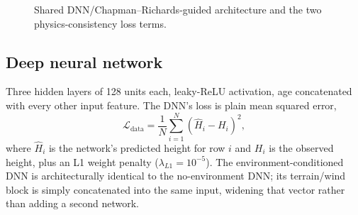 \documentclass[11pt,a4paper]{report}
\begin{document}
\begin{figure}[!htbp]
\centering
{}
\caption{Shared DNN/Chapman--Richards-guided architecture and the two physics-consistency loss
terms.}
\label{fig:model-architecture}
\end{figure}

\subsection{Deep neural network}

Three hidden layers of 128 units each, leaky-ReLU activation, age concatenated with every other
input feature. The DNN's loss is plain mean squared error,
\begin{equation}
\mathcal{L}_{\text{data}} = \frac{1}{N}\sum_{i=1}^{N}\left(\hat H_i - H_i\right)^2,
\label{eq:data-loss}
\end{equation}
where $\hat H_i$ is the network's predicted height for row $i$ and $H_i$ is the observed height,
plus an L1 weight penalty ($\lambda_{L1}=10^{-5}$). The environment-conditioned DNN is
architecturally identical to the no-environment DNN; its terrain/wind block is simply concatenated
into the same input, widening that vector rather than adding a second network.
\end{document}
